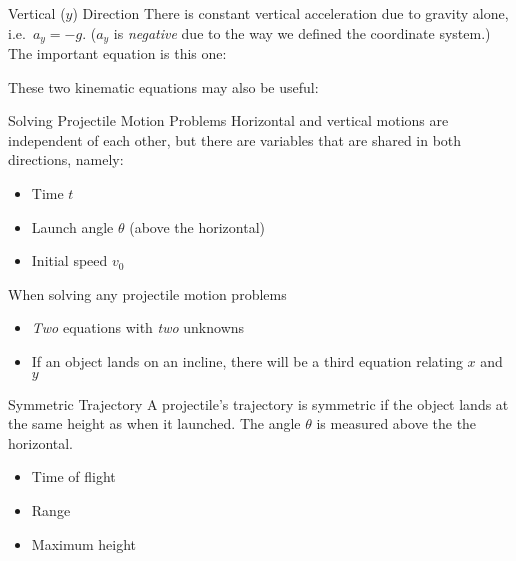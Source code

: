\documentclass[12pt,compress,aspectratio=169]{beamer}
\newcommand{\eq}[2]{\vspace{#1}{\Large\begin{displaymath}#2\end{displaymath}}}
\begin{document}
\begin{frame}{Vertical ($y$) Direction}
  There is constant vertical acceleration due to gravity alone, i.e.\
  $a_y=-g$. ($a_y$ is \emph{negative} due to the way we defined the
  coordinate system.) The important equation is this one:

  \eq{-.2in}{
    y = \left[v_0\sin\theta\right]t-\frac12gt^2
  }

  These two kinematic equations may also be useful:

  \vspace{-.2in}{\Large
    \begin{align*}
      v_y &= \left[v_0\sin\theta\right] -gt\\
      v_y^2&=\left[v_0^2\sin^2\theta\right]-2gy
    \end{align*}
  }
\end{frame}



\begin{frame}{Solving Projectile Motion Problems}
  Horizontal and vertical motions are independent of each other, but there are
  variables that are shared in both directions, namely:
  \begin{itemize}
  \item Time $t$
  \item Launch angle $\theta$ (above the horizontal)
  \item Initial speed $v_0$
  \end{itemize}
  
  \vspace{.2in}When solving any projectile motion problems
  \begin{itemize}
  \item \emph{Two} equations with \emph{two} unknowns
  \item If an object lands on an incline, there will be a third equation
    relating $x$ and $y$
  \end{itemize}
\end{frame}



\begin{frame}{Symmetric Trajectory}
  A projectile's trajectory is symmetric if the object lands at the same height
  as when it launched.   The angle $\theta$ is measured above the the horizontal.
  \begin{itemize}
  \item Time of flight
    \eq{-.1in}{t_\mathrm{max}=\frac{2v_0\sin\theta}{g}}
  \item Range
    \eq{-.1in}{R=\frac{v_0^2\sin(2\theta)}{g}}
  \item Maximum height
    \eq{-.1in}{y_\mathrm{max}=\frac{v_0^2\sin^2\theta}{2g}}
  \end{itemize}
\end{frame}
\end{document}
